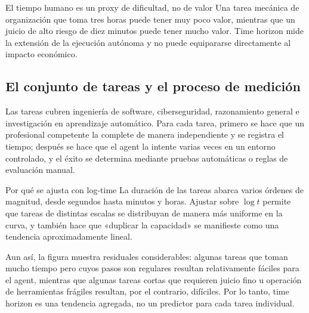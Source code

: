 \documentclass[a4paper]{article}
\begin{document}
\begin{importantbox}{El tiempo humano es un proxy de dificultad, no de valor}
Una tarea mecánica de organización que toma tres horas puede tener muy poco valor, mientras que un juicio de alto riesgo de diez minutos puede tener mucho valor. Time horizon mide la extensión de la ejecución autónoma y no puede equipararse directamente al impacto económico.
\end{importantbox}

\subsection{El conjunto de tareas y el proceso de medición}



Las tareas cubren ingeniería de software, ciberseguridad, razonamiento general e investigación en aprendizaje automático. Para cada tarea, primero se hace que un profesional competente la complete de manera independiente y se registra el tiempo; después se hace que el agent la intente varias veces en un entorno controlado, y el éxito se determina mediante pruebas automáticas o reglas de evaluación manual.

\begin{knowledgebox}{Por qué se ajusta con log-time}
La duración de las tareas abarca varios órdenes de magnitud, desde segundos hasta minutos y horas. Ajustar sobre $\log t$ permite que tareas de distintas escalas se distribuyan de manera más uniforme en la curva, y también hace que «duplicar la capacidad» se manifieste como una tendencia aproximadamente lineal.
\end{knowledgebox}


Aun así, la figura muestra residuales considerables: algunas tareas que toman mucho tiempo pero cuyos pasos son regulares resultan relativamente fáciles para el agent, mientras que algunas tareas cortas que requieren juicio fino u operación de herramientas frágiles resultan, por el contrario, difíciles. Por lo tanto, time horizon es una tendencia agregada, no un predictor para cada tarea individual.
\end{document}
